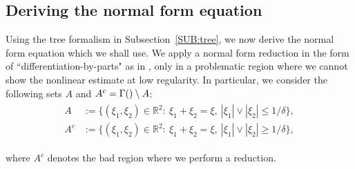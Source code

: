 \documentclass[a4paper,
11pt,  reqno]{amsart}
\makeatletter
\newcommand{\5}{\textup{V}}
\theoremstyle{remark}
\newcommand{\R}{\mathbb{R}}
\newcommand{\G}{\Gamma}
\def\<#1>{\csname MH@symb@#1\endcsname}
\numberwithin{equation}{section}
\numberwithin{theorem}{section}
\makeatother
\begin{document}
\subsection{Deriving the normal form equation}\label{sec:nfe}

Using the tree formalism in Subsection~\ref{SUB:tree}, we now derive the normal form equation which we shall use.
We apply a normal form reduction in the form of ``differentiation-by-parts" as in \cite{bit}, only in a problematic region where we cannot show the nonlinear estimate at low regularity.
In particular, we consider the following sets $A$ and $A^c = \G({\<1>}) \setminus A$: 
\begin{align}
\label{A}\begin{split} 
A & := \big\{ (\xi_{1}, \xi_{2}) \in \R^2: \ \xi_{1}+ \xi_{2} = \xi, \  |\xi_{1}| \lor  |\xi_{2}| \le 1/\delta  \big\}, \\
A^c & := \big\{ (\xi_{1}, \xi_2) \in \R^2: \ \xi_{1}+ \xi_{2} = \xi,  \ |\xi_{1}| \lor |\xi_{2}| \ge 1/\delta  \big\}, 
\end{split}
\end{align}

where $A^c$ denotes the bad region where we perform a reduction. 
\end{document}
